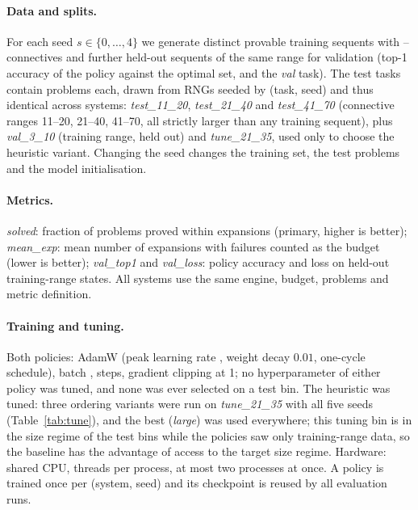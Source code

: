 \paragraph{Data and splits.} For each seed $s\in\{0,\dots,4\}$ we generate  distinct provable training sequents with -- connectives and  further held-out sequents of the same range for validation (top-1 accuracy of the policy against the optimal set, and the \emph{val} task). The test tasks contain  problems each, drawn from RNGs seeded by (task, seed) and thus identical across systems: \emph{test\_11\_20}, \emph{test\_21\_40} and \emph{test\_41\_70} (connective ranges 11--20, 21--40, 41--70, all strictly larger than any training sequent), plus \emph{val\_3\_10} (training range, held out) and \emph{tune\_21\_35}, used only to choose the heuristic variant. Changing the seed changes the training set, the test problems and the model initialisation.

\paragraph{Metrics.} \emph{solved}: fraction of problems proved within  expansions (primary, higher is better); \emph{mean\_exp}: mean number of expansions with failures counted as the budget (lower is better); \emph{val\_top1} and \emph{val\_loss}: policy accuracy and loss on held-out training-range states. All systems use the same engine, budget, problems and metric definition.

\paragraph{Training and tuning.} Both policies: AdamW (peak learning rate , weight decay $0.01$, one-cycle schedule), batch ,  steps, gradient clipping at 1; no hyperparameter of either policy was tuned, and none was ever selected on a test bin. The heuristic was tuned: three ordering variants were run on \emph{tune\_21\_35} with all five seeds (Table~\ref{tab:tune}), and the best (\emph{large}) was used everywhere; this tuning bin is in the size regime of the test bins while the policies saw only training-range data, so the baseline has the advantage of access to the target size regime. Hardware: shared CPU,  threads per process, at most two processes at once. A policy is trained once per (system, seed) and its checkpoint is reused by all evaluation runs.

